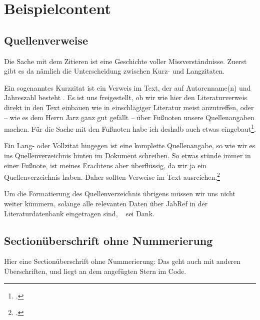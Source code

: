 


\chapter{Beispielcontent}


\section{Quellenverweise}

Die Sache mit dem Zitieren ist eine Geschichte voller Missverständnisse. Zuerst gibt es da nämlich die Unterscheidung zwischen Kurz- und Langzitaten.

Ein sogenanntes Kurzzitat ist ein Verweis im Text, der auf Autorenname(n) und Jahreszahl besteht \cite[vgl.][S.72]{Jarz2008}. Es ist uns freigestellt, ob wir wie hier den Literaturverweis direkt in den Text einbauen wie in einschlägiger Literatur meist anzutreffen, oder -- wie es dem Herrn Jarz ganz gut gefällt -- über Fußnoten unsere Quellenangaben machen. Für die Sache mit den Fußnoten habe ich deshalb auch etwas eingebaut\footcite[S.39]{Jarz2008}. 

Ein Lang- oder Vollzitat hingegen ist eine komplette Quellenangabe, so wie wir es ins Quellenverzeichnis hinten im Dokument schreiben. So etwas stünde immer in einer Fußnote, ist meines Erachtens aber überflüssig, da wir ja ein Quellenverzeichnis haben. Daher sollten Verweise im Text ausreichen.\footcite{zu}

Um die Formatierung des Quellenverzeichnis übrigens müssen wir uns nicht weiter kümmern, solange alle relevanten Daten über JabRef in der Literaturdatenbank eingetragen sind, \BibTeX~ sei Dank.







\section*{Sectionüberschrift ohne Nummerierung}
Hier eine Sectionüberschrift ohne Nummerierung: Das geht auch mit anderen Überschriften, und liegt an dem angefügten Stern im Code.



